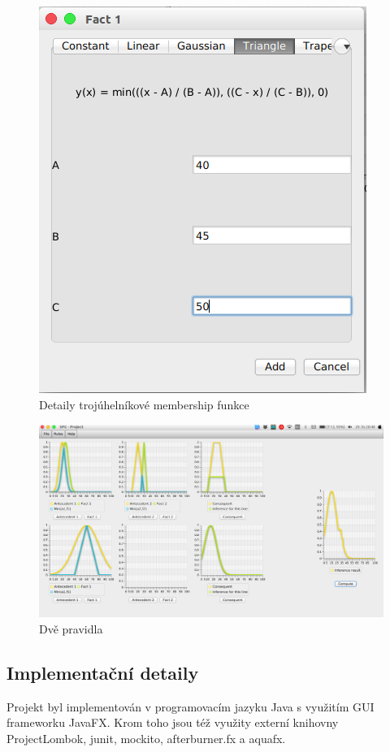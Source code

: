 \documentclass[12pt,a4paper,titlepage]{article}
\begin{document}
\begin{figure}[!htbp]
	\centering
	\includegraphics[scale=0.5]{setDetailsTriangle}
	\caption{Detaily trojúhelníkové membership funkce}
	\label{setDetailsTriangle}
\end{figure}

\begin{figure}[!htbp]
	\centering
	\includegraphics[scale=0.3]{twoRules}
	\caption{Dvě pravidla}
	\label{twoRules}
\end{figure}


\subsection{Implementační detaily}
Projekt byl implementován v programovacím jazyku Java s využitím GUI frameworku JavaFX. Krom toho jsou též využity externí knihovny ProjectLombok, junit, mockito, afterburner.fx a aquafx.
\end{document}

